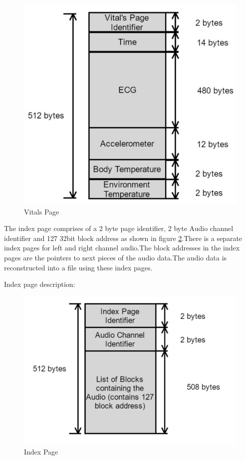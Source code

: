 \begin{figure}[h]
	\centering
	\includegraphics[scale = 0.5 ]{vital_page.JPG}
	\caption{Vitals Page\label{vital_page}}
\end{figure}

The index page comprises of a 2 byte page identifier, 2 byte Audio channel identifier and 127 32bit block address as shown in figure \ref{index_page}.There is a separate index pages for left and right channel audio.The block addresses in the index pages are the pointers to next pieces of the audio data.The audio data is reconstructed into a file using these index pages.

Index page description: 
\begin{figure}[h]
	\centering
	\includegraphics[scale = 0.5 ]{index_page.JPG}
	\caption{Index Page\label{index_page}}
\end{figure}


